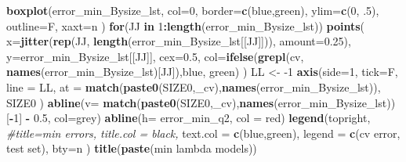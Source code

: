 \documentclass[
]{book}
\newenvironment{Shaded}{\begin{snugshade}}{\end{snugshade}}
\newcommand{\CommentTok}[1]{\textcolor[rgb]{0.56,0.35,0.01}{\textit{#1}}}
\newcommand{\ControlFlowTok}[1]{\textcolor[rgb]{0.13,0.29,0.53}{\textbf{#1}}}
\newcommand{\DataTypeTok}[1]{\textcolor[rgb]{0.13,0.29,0.53}{#1}}
\newcommand{\DecValTok}[1]{\textcolor[rgb]{0.00,0.00,0.81}{#1}}
\newcommand{\FloatTok}[1]{\textcolor[rgb]{0.00,0.00,0.81}{#1}}
\newcommand{\KeywordTok}[1]{\textcolor[rgb]{0.13,0.29,0.53}{\textbf{#1}}}
\newcommand{\NormalTok}[1]{#1}
\newcommand{\OperatorTok}[1]{\textcolor[rgb]{0.81,0.36,0.00}{\textbf{#1}}}
\newcommand{\StringTok}[1]{\textcolor[rgb]{0.31,0.60,0.02}{#1}}
\begin{document}
\begin{Shaded}
\begin{Highlighting}[]
\KeywordTok{boxplot}\NormalTok{(error\_min\_Bysize\_lst,}
  \DataTypeTok{col=}\DecValTok{0}\NormalTok{,}
  \DataTypeTok{border=}\KeywordTok{c}\NormalTok{(}\StringTok{\textquotesingle{}blue\textquotesingle{}}\NormalTok{,}\StringTok{\textquotesingle{}green\textquotesingle{}}\NormalTok{),}
  \DataTypeTok{ylim=}\KeywordTok{c}\NormalTok{(}\DecValTok{0}\NormalTok{, }\FloatTok{.5}\NormalTok{),}
  \DataTypeTok{outline=}\NormalTok{F,}
  \DataTypeTok{xaxt=}\StringTok{\textquotesingle{}n\textquotesingle{}}
\NormalTok{)}
\ControlFlowTok{for}\NormalTok{(JJ }\ControlFlowTok{in} \DecValTok{1}\OperatorTok{:}\KeywordTok{length}\NormalTok{(error\_min\_Bysize\_lst))}
\KeywordTok{points}\NormalTok{(}
   \DataTypeTok{x=}\KeywordTok{jitter}\NormalTok{(}\KeywordTok{rep}\NormalTok{(JJ, }\KeywordTok{length}\NormalTok{(error\_min\_Bysize\_lst[[JJ]])), }\DataTypeTok{amount=}\FloatTok{0.25}\NormalTok{), }
   \DataTypeTok{y=}\NormalTok{error\_min\_Bysize\_lst[[JJ]], }\DataTypeTok{cex=}\FloatTok{0.5}\NormalTok{,}
   \DataTypeTok{col=}\KeywordTok{ifelse}\NormalTok{(}\KeywordTok{grepl}\NormalTok{(}\StringTok{\textquotesingle{}cv\textquotesingle{}}\NormalTok{, }\KeywordTok{names}\NormalTok{(error\_min\_Bysize\_lst)[JJ]),}\StringTok{\textquotesingle{}blue\textquotesingle{}}\NormalTok{, }\StringTok{\textquotesingle{}green\textquotesingle{}}\NormalTok{)}
\NormalTok{)}
\NormalTok{LL <{-}}\StringTok{ }\DecValTok{{-}1}
\KeywordTok{axis}\NormalTok{(}\DataTypeTok{side=}\DecValTok{1}\NormalTok{, }\DataTypeTok{tick=}\NormalTok{F, }\DataTypeTok{line =}\NormalTok{ LL,}
  \DataTypeTok{at =} \KeywordTok{match}\NormalTok{(}\KeywordTok{paste0}\NormalTok{(SIZE0,}\StringTok{\textquotesingle{}\_cv\textquotesingle{}}\NormalTok{),}\KeywordTok{names}\NormalTok{(error\_min\_Bysize\_lst)),}
\NormalTok{  SIZE0}
\NormalTok{ )}
\KeywordTok{abline}\NormalTok{(}\DataTypeTok{v=} \KeywordTok{match}\NormalTok{(}\KeywordTok{paste0}\NormalTok{(SIZE0,}\StringTok{\textquotesingle{}\_cv\textquotesingle{}}\NormalTok{),}\KeywordTok{names}\NormalTok{(error\_min\_Bysize\_lst))[}\OperatorTok{{-}}\DecValTok{1}\NormalTok{] }\OperatorTok{{-}}\StringTok{ }\FloatTok{0.5}\NormalTok{, }\DataTypeTok{col=}\StringTok{\textquotesingle{}grey\textquotesingle{}}\NormalTok{)}
\KeywordTok{abline}\NormalTok{(}\DataTypeTok{h=}\NormalTok{ error\_min\_q2, }\DataTypeTok{col =} \StringTok{\textquotesingle{}red\textquotesingle{}}\NormalTok{)}
\KeywordTok{legend}\NormalTok{(}\StringTok{\textquotesingle{}topright\textquotesingle{}}\NormalTok{,}
   \CommentTok{\#title=\textquotesingle{}min errors\textquotesingle{}, title.col = \textquotesingle{}black\textquotesingle{},}
   \DataTypeTok{text.col =} \KeywordTok{c}\NormalTok{(}\StringTok{\textquotesingle{}blue\textquotesingle{}}\NormalTok{,}\StringTok{\textquotesingle{}green\textquotesingle{}}\NormalTok{),}
   \DataTypeTok{legend =} \KeywordTok{c}\NormalTok{(}\StringTok{\textquotesingle{}cv error\textquotesingle{}}\NormalTok{, }\StringTok{\textquotesingle{}test set\textquotesingle{}}\NormalTok{),}
   \DataTypeTok{bty=}\StringTok{\textquotesingle{}n\textquotesingle{}}
\NormalTok{ )}
\KeywordTok{title}\NormalTok{(}\KeywordTok{paste}\NormalTok{(}\StringTok{\textquotesingle{}min lambda models\textquotesingle{}}\NormalTok{))}



\end{Highlighting}
\end{Shaded}
\end{document}
